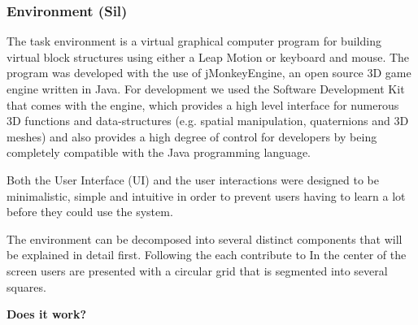\subsubsection{Environment (Sil)}

The task environment is a virtual graphical computer program for building virtual block structures using either a Leap Motion or keyboard and mouse. The program was developed with the use of jMonkeyEngine, an open source 3D game engine written in Java. For development we used the Software Development Kit that comes with the engine, which provides a high level interface for numerous 3D functions and data-structures (e.g. spatial manipulation, quaternions and 3D meshes) and also provides a high degree of control for developers by being completely compatible with the Java programming language. 

Both the User Interface (UI) and the user interactions were designed to be minimalistic, simple and intuitive in order to prevent users having to learn a lot before they could use the system. 

The environment can be decomposed into several distinct components that will be explained in detail first. Following the   each contribute to In the center of the screen users are presented with a circular grid that is segmented into several squares. 

\textbf{Does it work?}